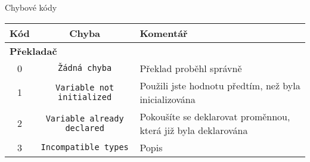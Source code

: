 \documentclass[
12pt,
a4paper,
pdftex,
czech
]{report}
\begin{document}
\begin{table}[]
\centering
\caption{Chybové kódy}
\label{chyby}
\end{table}
\begin{longtable}{|c|c|p{8cm}|}
\hline
		\textbf{Kód} & \textbf{Chyba} & \textbf{Komentář} \\
\hline\hline
\multicolumn{3}{|l|}{\textbf{Překladač}}\\ \hline
 \rule{0pt}{3ex}0 & \texttt{Žádná chyba} & Překlad proběhl správně \\ \hline
\rule{0pt}{3ex}1 & \texttt{Variable not initialized} & Použili jste hodnotu předtím, než byla inicializována \\ \hline
\rule{0pt}{3ex}2 & \texttt{Variable already declared} & Pokoušíte se deklarovat proměnnou, která již byla deklarována \\ \hline
\rule{0pt}{3ex}3 & \texttt{Incompatible types} & Popis \\ \hline
\end{longtable}
\end{document}
